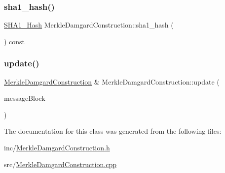 \subsubsection{\texorpdfstring{sha1\+\_\+hash()}{sha1\_hash()}}
{\footnotesize\ttfamily \mbox{\hyperlink{struct_s_h_a1___hash}{S\+H\+A1\+\_\+\+Hash}} Merkle\+Damgard\+Construction\+::sha1\+\_\+hash (\begin{DoxyParamCaption}{ }\end{DoxyParamCaption}) const}

\mbox{\label{class_merkle_damgard_construction_a58d9ed99998a3f4e53676cd26a8938f9}} 
\subsubsection{\texorpdfstring{update()}{update()}}
{\footnotesize\ttfamily \mbox{\hyperlink{class_merkle_damgard_construction}{Merkle\+Damgard\+Construction}} \& Merkle\+Damgard\+Construction\+::update (\begin{DoxyParamCaption}\item[{const \mbox{\hyperlink{class_message_block}{Message\+Block}} \&}]{message\+Block }\end{DoxyParamCaption})}



The documentation for this class was generated from the following files\+:\begin{DoxyCompactItemize}
\item 
inc/\mbox{\hyperlink{_merkle_damgard_construction_8h}{Merkle\+Damgard\+Construction.\+h}}\item 
src/\mbox{\hyperlink{_merkle_damgard_construction_8cpp}{Merkle\+Damgard\+Construction.\+cpp}}\end{DoxyCompactItemize}
